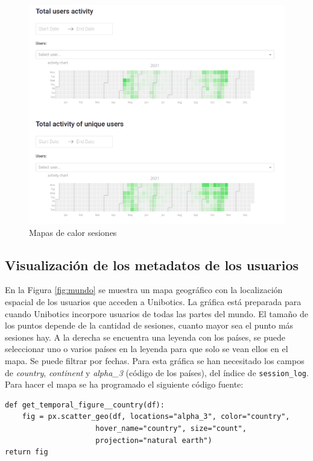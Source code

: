 \begin{figure}[H]
    \centering
    \includegraphics[width=18cm, keepaspectratio]{img/activity.png}
    \caption{Mapas de calor sesiones}
    \label{fig:activity}
\end{figure}

\subsection{Visualización de los metadatos de los usuarios}
En la Figura \ref{fig:mundo} se muestra un mapa geográfico con la localización espacial  de los usuarios que acceden a Unibotics. La gráfica está preparada para cuando Unibotics incorpore usuarios de todas las partes del mundo. El tamaño de los puntos depende de la cantidad de sesiones, cuanto mayor sea el punto más sesiones hay. A la derecha se encuentra una leyenda con los países, se puede seleccionar uno o varios países en la leyenda para que solo se vean ellos en el mapa. Se puede filtrar por fechas. Para esta gráfica se han necesitado los campos de \textit{country}, \textit{continent} y \textit{alpha\_3} (código de los países), del índice de \texttt{session\_log}. Para hacer el mapa se ha programado el siguiente código fuente:
\\
\begin{lstlisting}
def get_temporal_figure__country(df):
    fig = px.scatter_geo(df, locations="alpha_3", color="country",
                     hover_name="country", size="count",
                     projection="natural earth")
return fig
\end{lstlisting}



